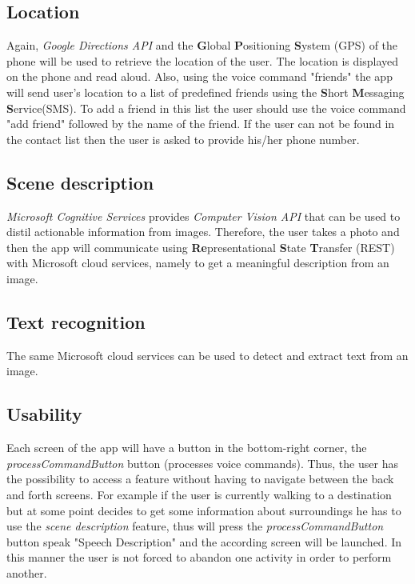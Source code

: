 \documentclass{article}[11]
\begin{document}
\subsection{Location}
	Again, \emph{Google Directions API} and the \textbf{G}lobal \textbf{P}ositioning \textbf{S}ystem (GPS) of the phone will be used to retrieve the location of the user. The location is displayed on the phone and read aloud. Also, using the voice command "friends" the app will send user's location to a list of predefined friends using the \textbf{S}hort \textbf{M}essaging \textbf{S}ervice(SMS). To add a friend in this list the user should use the voice command "add friend" followed by the name of the friend. If the user can not be found in the contact list then the user is asked to provide his/her phone number.
	
\subsection{Scene description}
	\emph{Microsoft Cognitive Services} provides \emph{Computer Vision API} that can be used to distil actionable information from images. Therefore, the user takes a photo and then the app will communicate using \textbf{Re}presentational \textbf{S}tate \textbf{T}ransfer (REST) with Microsoft cloud services, namely to get a meaningful description from an image.
	
\subsection{Text recognition}
	The same Microsoft cloud services can be used to detect and extract text from an image.
	
\subsection{Usability}
	Each screen of the app will have a button in the bottom-right corner, the \emph{processCommandButton} button (processes voice commands). Thus, the user has the possibility to access a feature without having to navigate between the back and forth screens. For example if the user is currently walking to a destination but at some point decides to get some information about surroundings he has to use the \emph{scene description} feature, thus will press the \emph{processCommandButton} button speak "Speech Description" and the according screen will be launched. In this manner the user is not forced to abandon one activity in order to perform another.\\
	
\end{document}
